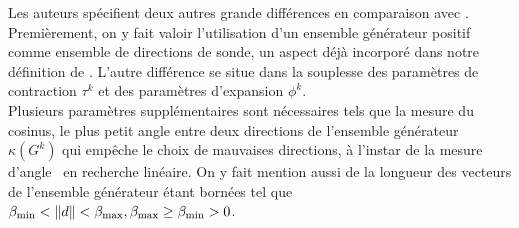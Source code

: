 Les auteurs spécifient deux autres grande différences en comparaison avec \CS. Premièrement, on y fait valoir l'utilisation d'un ensemble générateur positif comme ensemble de directions de sonde, un aspect déjà incorporé dans notre définition de \GPS. L'autre différence se situe dans la souplesse des paramètres de contraction $\tau^k$ et des paramètres d'expansion $\phi^k$.\\
Plusieurs paramètres supplémentaires sont nécessaires tels que la mesure du cosinus, le plus petit angle entre deux directions de l'ensemble générateur $\kappa(G^k)$ qui empêche le choix de mauvaises directions, à l'instar de la mesure d'angle~\cite{griva2009linear,OrRh70a} en recherche linéaire. On y fait mention aussi de la longueur des vecteurs de l'ensemble générateur étant bornées tel que $\beta_{\min}<\left\lVert d\right\rVert<\beta_{\max}, \beta_{\max} \geq \beta_{\min} >0$.
